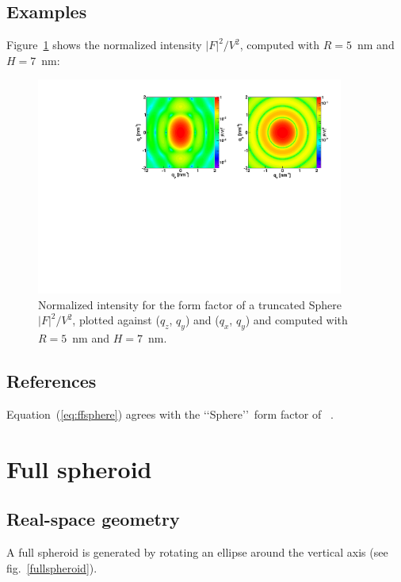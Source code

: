 \subsection{Examples}
Figure~\ref{figSphereEx} shows the normalized intensity $|F|^2/V^2$, computed with $R=5$~nm and $H=7$~nm:
\begin{figure}[h]
\begin{center}
\includegraphics[width=0.9\textwidth]{Figures/figffsphere}
\end{center}
\caption{Normalized intensity for the form factor of a truncated Sphere
  $|F|^2/V^2$, plotted against ($q_z$, $q_y$) and ($q_x$, $q_y$) and
  computed with $R=5$~nm and $H=7$~nm.}
\label{figSphereEx}
\end{figure}

\FloatBarrier


\subsection{References}
Equation~(\ref{eq:ffsphere}) agrees with the \lq\lq Sphere\rq\rq ~form
factor of \IsGISAXS~\cite{Laz02}.
\newpage{\cleardoublepage}
\section{Full spheroid}   

\subsection{Real-space geometry}
A full spheroid is generated by rotating an ellipse around the vertical
axis (see fig.~\ref{fullspheroid}).

